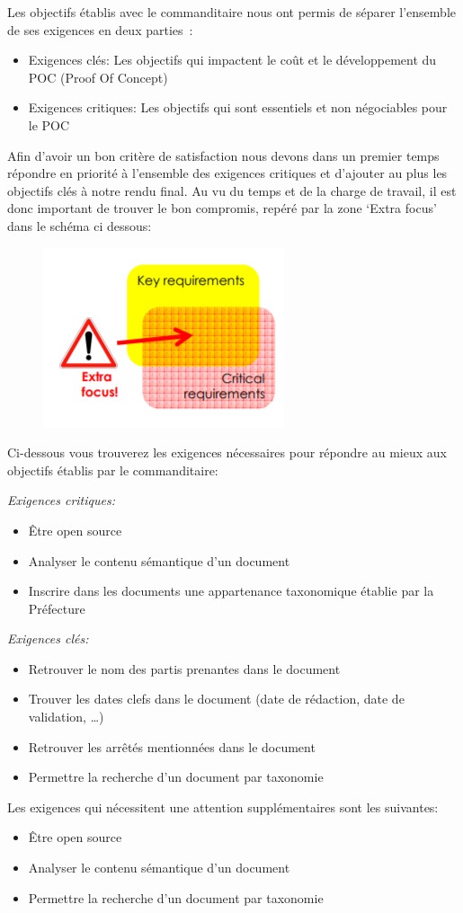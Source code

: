 Les objectifs établis avec le commanditaire nous ont permis de séparer l'ensemble de ses exigences en deux parties :
\begin{itemize}
\item Exigences clés: Les objectifs qui impactent le coût et le développement du  POC (Proof Of Concept)
\item Exigences critiques: Les objectifs qui sont essentiels et non négociables pour le POC
\end{itemize}

\par
Afin d'avoir un bon critère de satisfaction nous devons dans un premier temps répondre en priorité à l'ensemble des exigences critiques et d'ajouter au plus les objectifs clés à notre rendu final.
\newpage
Au vu du temps et de la charge de travail, il est donc important de trouver le bon compromis, repéré par la zone `Extra focus' dans le schéma ci dessous: 

\begin{figure}[h!]
	\includegraphics{images/requirements.png}
	\label{fig:exigences}
\end{figure}		

Ci-dessous vous trouverez les exigences nécessaires pour répondre au mieux aux objectifs établis par le commanditaire:

\emph{Exigences critiques:}
\begin{itemize}
\item Être open source
\item Analyser le contenu sémantique d'un document
\item Inscrire dans les documents une appartenance taxonomique établie par la Préfecture
\end{itemize}


\emph{Exigences clés:}
\begin{itemize}
\item Retrouver le nom des partis prenantes dans le document
\item Trouver les dates clefs dans le document (date de rédaction, date de validation, \ldots)
\item Retrouver les arrêtés mentionnées dans le document
\item Permettre la recherche d'un document par taxonomie
\end{itemize}


Les exigences qui nécessitent une attention supplémentaires sont les suivantes:
\begin{itemize}
\item Être open source
\item Analyser le contenu sémantique d'un document
\item Permettre la recherche d'un document par taxonomie
\end{itemize}





